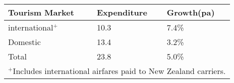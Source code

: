 \begin{tabular}[t]{|p{4.75cm}|p{1.25cm}|p{1.25cm}|}
  \hline
Tourism Market & Expenditure & Growth(pa) \\ 
  \hline
international$^+$ & 10.3 & 7.4\% \\ 
  Domestic & 13.4 & 3.2\% \\ 
  Total & 23.8 & 5.0\% \\ 
   \hline
\multicolumn{3}{p{7.5cm}}{$^+$Includes international airfares paid to New Zealand carriers.}\\ 
\end{tabular}
